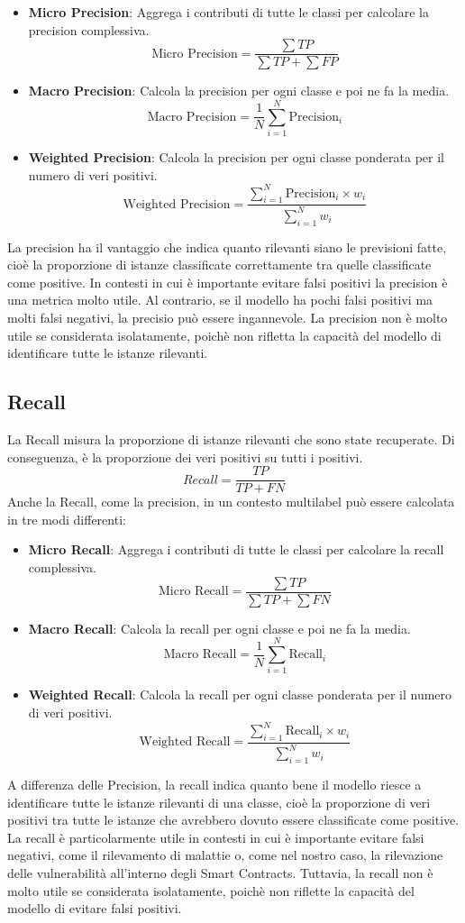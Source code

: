 \documentclass[../../Thesis.tex]{subfiles}
\begin{document}
\begin{itemize}
    \item \textbf{Micro Precision}: Aggrega i contributi di tutte le classi per calcolare la precision complessiva.
    $$ \text{Micro Precision} = \frac{\sum TP}{\sum TP + \sum FP} $$
    \item \textbf{Macro Precision}: Calcola la precision per ogni classe e poi ne fa la media.
    $$ \text{Macro Precision} = \frac{1}{N} \sum_{i=1}^{N} \text{Precision}_i $$
    \item \textbf{Weighted Precision}: Calcola la precision per ogni classe ponderata per il numero di veri positivi.
    $$ \text{Weighted Precision} = \frac{\sum_{i=1}^{N} \text{Precision}_i \times w_i}{\sum_{i=1}^{N} w_i} $$
\end{itemize}
La precision ha il vantaggio che indica quanto rilevanti siano le previsioni fatte, cio\`e la proporzione di istanze classificate correttamente tra quelle classificate come positive. In contesti in cui \`e importante evitare falsi positivi la precision \`e una metrica molto utile. Al contrario, se il modello ha pochi falsi positivi ma molti falsi negativi, la precisio pu\`o essere ingannevole. La precision non \`e molto utile se considerata isolatamente, poich\`e non rifletta la capacit\`a del modello di identificare tutte le istanze rilevanti.

\subsection{Recall}
La Recall misura la proporzione di istanze rilevanti che sono state recuperate. Di conseguenza, \`e la proporzione dei veri positivi su tutti i positivi.
$$Recall = \frac{ TP}{TP + FN} $$
Anche la Recall, come la precision, in un contesto multilabel pu\`o essere calcolata in tre modi differenti:
\begin{itemize}
    \item \textbf{Micro Recall}: Aggrega i contributi di tutte le classi per calcolare la recall complessiva.
    $$ \text{Micro Recall} = \frac{\sum TP}{\sum TP + \sum FN} $$
    \item \textbf{Macro Recall}: Calcola la recall per ogni classe e poi ne fa la media.
    $$ \text{Macro Recall} = \frac{1}{N} \sum_{i=1}^{N} \text{Recall}_i $$
    \item \textbf{Weighted Recall}: Calcola la recall per ogni classe ponderata per il numero di veri positivi.
    $$ \text{Weighted Recall} = \frac{\sum_{i=1}^{N} \text{Recall}_i \times w_i}{\sum_{i=1}^{N} w_i} $$
\end{itemize}
A differenza delle Precision, la recall indica quanto bene il modello riesce a identificare tutte le istanze rilevanti di una classe, cio\`e la proporzione di veri positivi tra tutte le istanze che avrebbero dovuto essere classificate come positive. La recall \`e particolarmente utile in contesti in cui \`e importante evitare falsi negativi, come il rilevamento di malattie o, come nel nostro caso, la rilevazione delle vulnerabilit\`a all'interno degli Smart Contracts. Tuttavia, la recall non \`e molto utile se considerata isolatamente, poich\`e non riflette la capacit\`a del modello di evitare falsi positivi.
\end{document}
